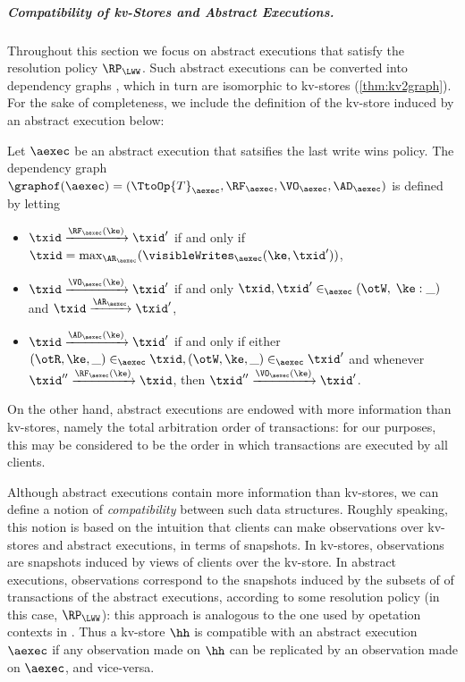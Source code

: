 \subparagraph{Compatibility of kv-Stores and Abstract Executions.}
Throughout this section we focus on abstract executions that satisfy the 
resolution policy $\RP_{\LWW}$.
Such abstract executions can be converted into dependency graphs \cite{podc2016,laws}, 
which in turn are isomorphic to kv-stores (\cref{thm:kv2graph}). For the sake of completeness, 
we include the definition of the kv-store induced by an abstract execution below: 

\begin{definition}
\label{def:aexec2graph}
Let $\aexec$ be an abstract execution that satsifies the last write wins policy. 
The dependency graph $\graphof(\aexec) = (\TtoOp{T}_{\aexec}, \RF_{\aexec}, 
\VO_{\aexec}, \AD_{\aexec})$ is defined by letting
\begin{itemize}
\item $\txid \xrightarrow{\RF_{\aexec}(\ke)} \txid'$ if and only if 
$\txid = \max_{\AR_{\aexec}}(\visibleWrites_{\aexec}(\ke, \txid'))$, 
\item $\txid \xrightarrow{\VO_{\aexec}(\ke)} \txid'$ if and only 
$\txid, \txid' \in_{\aexec} (\otW, \;\ke: \_)$ 
and $\txid \xrightarrow{\AR_{\aexec}} \txid'$,
\item $\txid \xrightarrow{\AD_{\aexec}(\ke)} \txid'$ if and only if either 
$(\otR, \ke, \_) \in_{\aexec} \txid, (\otW, \ke, \_) \in_{\aexec} \txid'$ and 
whenever $\txid'' \xrightarrow{\RF_{\aexec}(\ke)} \txid$, 
then $\txid'' \xrightarrow{\VO_{\aexec}(\ke)} \txid'$.
\end{itemize}
\end{definition}

On the other hand, 
abstract executions are endowed with more information than kv-stores, namely the total 
arbitration order of transactions: for our purposes, this may be considered to be the order in which transactions 
are executed by all clients.

Although abstract executions contain more information than kv-stores, 
we can define a notion of \emph{compatibility} between such data structures. Roughly speaking, 
this notion is based on the intuition that clients can make observations over kv-stores and abstract 
executions, in terms of snapshots. In kv-stores, 
observations are snapshots induced by views of clients over the kv-store. 
In abstract executions, observations correspond to the snapshots induced by the subsets of
of transactions of the abstract executions, according to some resolution policy (in this 
case, $\RP_{\LWW}$): this approach is analogous to the one used by 
opetation contexts in \cite{repldatatypes}. Thus a kv-store $\hh$ is 
compatible with an abstract execution $\aexec$ if any observation 
made on $\hh$ can be replicated by an observation made on 
$\aexec$, and vice-versa. 

